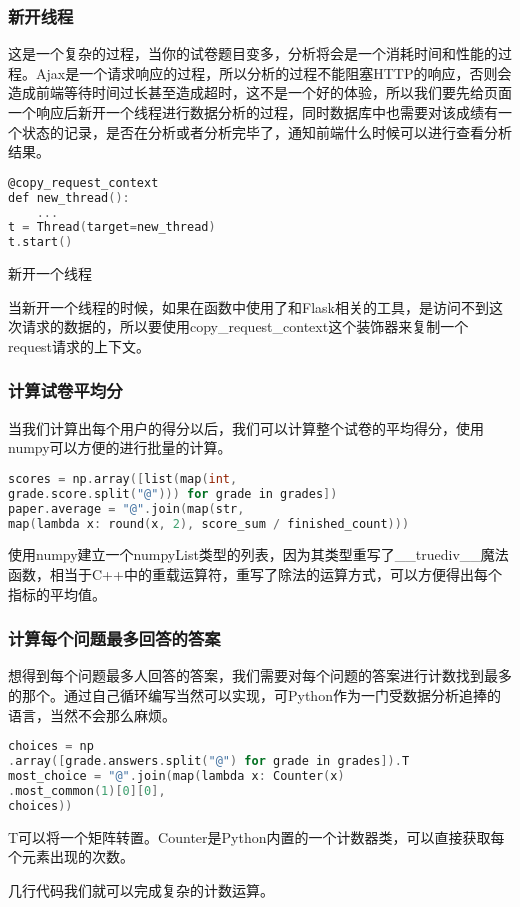 \subsubsection{新开线程}

这是一个复杂的过程，当你的试卷题目变多，分析将会是一个消耗时间和性能的过程。Ajax是一个请求响应的过程，所以分析的过程不能阻塞HTTP的响应，否则会造成前端等待时间过长甚至造成超时，这不是一个好的体验，所以我们要先给页面一个响应后新开一个线程进行数据分析的过程，同时数据库中也需要对该成绩有一个状态的记录，是否在分析或者分析完毕了，通知前端什么时候可以进行查看分析结果。

\begin{lstlisting}[language=C]
@copy_request_context
def new_thread():
	...
t = Thread(target=new_thread)
t.start()
\end{lstlisting}

\begin{center}
	{\small 新开一个线程}
\end{center}

当新开一个线程的时候，如果在函数中使用了和Flask相关的工具，是访问不到这次请求的数据的，所以要使用copy\_request\_context这个装饰器来复制一个request请求的上下文。

\subsubsection{计算试卷平均分}

当我们计算出每个用户的得分以后，我们可以计算整个试卷的平均得分，使用numpy可以方便的进行批量的计算。

\begin{lstlisting}[language=C]
scores = np.array([list(map(int, 
grade.score.split("@"))) for grade in grades])
paper.average = "@".join(map(str, 
map(lambda x: round(x, 2), score_sum / finished_count)))
\end{lstlisting}

使用numpy建立一个numpyList类型的列表，因为其类型重写了\_\_truediv\_\_魔法函数，相当于C++中的重载运算符，重写了除法的运算方式，可以方便得出每个指标的平均值。

\subsubsection{计算每个问题最多回答的答案}

想得到每个问题最多人回答的答案，我们需要对每个问题的答案进行计数找到最多的那个。通过自己循环编写当然可以实现，可Python作为一门受数据分析追捧的语言，当然不会那么麻烦。

\begin{lstlisting}[language=C]
choices = np
.array([grade.answers.split("@") for grade in grades]).T
most_choice = "@".join(map(lambda x: Counter(x)
.most_common(1)[0][0],
choices))
\end{lstlisting}

T可以将一个矩阵转置。Counter是Python内置的一个计数器类，可以直接获取每个元素出现的次数。

几行代码我们就可以完成复杂的计数运算。
